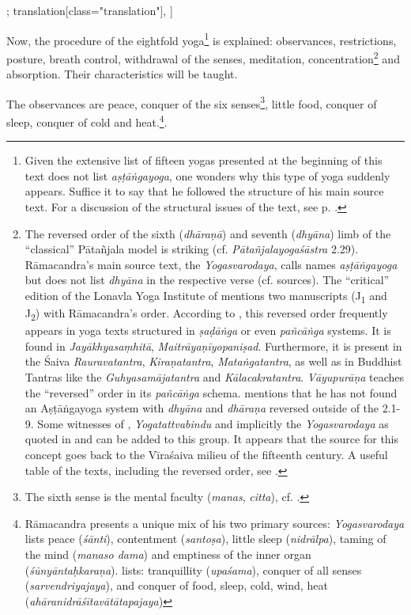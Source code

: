 \begin{alignment}[
  texts=edition[class="edition"];
  translation[class="translation"],
  ]
\begin{translation}
\begin{tlate}[p31_01]
Now, the procedure of the eightfold yoga\footnote{Given the extensive list of fifteen yogas presented at the beginning of this text does not list \textit{aṣṭāṅgayoga}, one wonders why this type of yoga suddenly appears. Suffice it to say that he followed the structure of his main source text. For a discussion of the structural issues of the text, see p. \pageref{structure}.} is explained: observances, restrictions, posture, breath control, withdrawal of the senses, meditation, concentration\footnote{The reversed order of the sixth (\textit{dhāraṇā}) and seventh (\textit{dhyāna}) limb of the ``classical'' Pātañjala model is striking (cf. \textit{Pātañjalayogaśāstra} 2.29). Rāmacandra's main source text, the \textit{Yogasvarodaya}, calls names \textit{aṣṭāṅgayoga} but does not list \textit{dhyāna} in the respective verse (cf. sources). The ``critical'' edition of the Lonavla Yoga Institute of  mentions two manuscripts (J\textsubscript{1} and J\textsubscript{2}) with Rāmacandra's order. According to \citeauthor[2004:380-381]{vasudeva2004}, this reversed order frequently appears in yoga texts structured in \textit{ṣaḍāṅga} or even \textit{pañcāṅga} systems. It is found in \textit{Jayākhyasaṃhitā}, \textit{Maitrāyaṇīyopaniṣad}. Furthermore, it is present in the Śaiva \textit{Rauravatantra}, \textit{Kiraṇatantra}, \textit{Mataṅgatantra}, as well as in Buddhist Tantras like the \textit{Guhyasamājatantra} and \textit{Kālacakratantra}. \textit{Vāyupurāṇa} teaches the ``reversed'' order in its \textit{pañcāṅga} schema. \citeauthor[2023:168]{shivayogapradipika} mentions that he has not found an Aṣṭāṅgayoga system with \textit{dhyāna} and \textit{dhāraṇa} reversed outside of the  2.1-9. Some witnesses of , \textit{Yogatattvabindu} and implicitly the \textit{Yogasvarodaya} as quoted in  and  can be added to this group. It appears that the source for this concept goes back to the Vīraśaiva milieu of the fifteenth century. A useful table of the texts, including the reversed order, see \citeauthor[2023:166]{shivayogapradipika}.} and absorption. Their characteristics will be taught.

The observances are peace, conquer of the six senses\footnote{The sixth sense is the mental faculty (\textit{manas}, \textit{citta}), cf. \citeauthor[2021:18]{white2021}.}, little food, conquer of sleep, conquer of cold and heat.\footnote{Rāmacandra presents a unique mix of his two primary sources: \textit{Yogasvarodaya} lists peace (\textit{śānti}), contentment (\textit{santoṣa}), little sleep (\textit{nidrālpa}), taming of the mind (\textit{manaso dama}) and emptiness of the inner organ (\textit{śūnyāntaḥkaraṇa}).  lists: tranquillity (\textit{upaśama}), conquer of all senses (\textit{sarvendriyajaya}), and conquer of food, sleep, cold, wind, heat (\textit{ahāranidrāśītavātātapajaya})}.


\end{tlate}
\end{translation}
\end{alignment}
